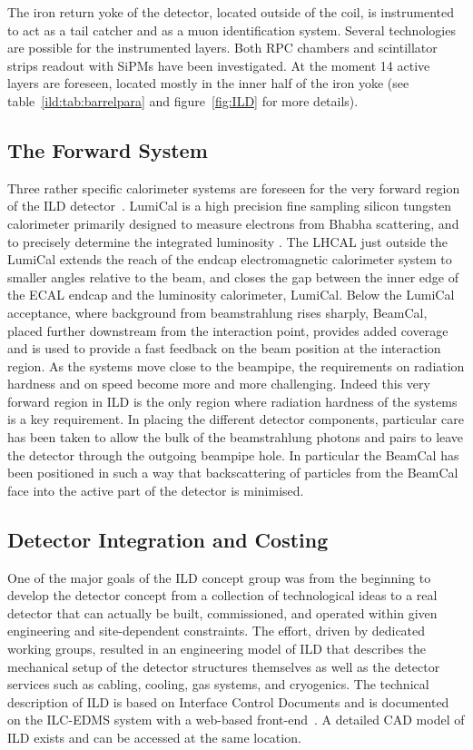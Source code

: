 \documentclass[%
 amsmath,amssymb,
 aps,
 longbibliography,
]{revtex4-1}
\begin{document}
The iron return yoke of the detector, located outside of the coil, is instrumented to act as a tail catcher and as a muon identification system. Several technologies are possible for the instrumented layers. Both RPC chambers and scintillator strips readout with SiPMs have been investigated. At the moment 14 active layers are foreseen, located mostly in the inner half of the iron yoke (see table~\ref{ild:tab:barrelpara} and figure~\ref{fig:ILD} for more details).

\subsection{The Forward System}
Three rather specific calorimeter systems are foreseen for the very forward region of the ILD detector~\cite{Abramowicz:2010bg}. LumiCal is a high precision fine sampling silicon tungsten calorimeter primarily designed to measure electrons from Bhabha scattering, and to precisely determine the integrated luminosity \cite{Bozovic-Jelisavcic:2014aza}. The LHCAL just outside the LumiCal extends the reach of the endcap electromagnetic calorimeter system to smaller angles relative to the beam, and closes the gap between the inner edge of the ECAL endcap and the luminosity calorimeter, LumiCal.  Below the LumiCal acceptance, where background from beamstrahlung rises sharply, BeamCal, placed further downstream from the interaction point, provides added coverage and is used to provide a fast feedback on the beam position at the interaction region. As the systems move close to the beampipe, the requirements on radiation hardness and on speed become more and more challenging. Indeed this very forward region in ILD is the only region where radiation hardness of the systems is a key requirement. In placing the different detector components, particular care has been taken to allow the bulk of the beamstrahlung photons and pairs to leave the detector through the outgoing beampipe hole. In particular the BeamCal has been positioned in such a way that backscattering of particles from the BeamCal face into the active part of the detector is minimised.

\subsection{Detector Integration and Costing}
One of the major goals of the ILD concept group was from the beginning to develop the detector concept from a collection of technological ideas to a real detector that can actually be built, commissioned, and operated within given engineering and site-dependent constraints. The effort, driven by dedicated working groups, resulted in an engineering model of ILD that describes the mechanical setup of the detector structures themselves as well as the detector services such as cabling, cooling, gas systems, and cryogenics. The technical description of ILD is based on Interface Control Documents and is documented on the ILC-EDMS system with a web-based front-end~\cite{EDMS}. A detailed CAD model of ILD exists and can be accessed at the same location.
\end{document}
